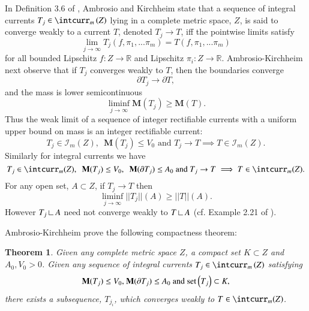 \documentclass[12pt]{amsart}
\newtheorem{thm}{Theorem}[section]
\begin{document}
In Definition 3.6 of \cite{AK}, Ambrosio and Kirchheim state that a
sequence of integral currents $T_j \in \intcurr_m\left(Z\right)$ 
lying in a complete metric space, $Z$,
is said to converge weakly to a current $T$, denoted $T_j {\to} T$,
 iff the pointwise limits satisfy
\begin{equation}
\lim_{j\to \infty}  T_j\left(f, \pi_1,...\pi_m\right) = T\left(f, \pi_1,...\pi_m\right) 
\end{equation}
for all bounded Lipschitz $f: Z \to {\mathbb{R}}$ and Lipschitz $\pi_i: Z \to {\mathbb{R}}$.
Ambrosio-Kirchheim next observe that if $T_j$ converges weakly to $T$, then 
the boundaries converge
\begin{equation}\label{bndry-conv}
\partial T_j {\to} \partial T,   
\end{equation}
and the mass is lower semicontinuous
\begin{equation}\label{semicont}
\liminf_{j\to\infty} {{\mathbf M}}(T_j) \ge {{\mathbf M}}(T).
\end{equation}
Thus the weak limit of a sequence of integer rectifiable
currents with a uniform upper bound on mass is an
integer rectifiable current:
\begin{equation}
T_j \in {{\mathcal I}}_m(Z), \,\,\,{{\mathbf M}}(T_j) \le V_0
\textrm{ and }
T_j \to T \implies T \in {{\mathcal I}}_m(Z).
\end{equation}
Similarly for integral currents we have
\begin{equation}
T_j \in \intcurr_m(Z), \,\,\,{{\mathbf M}}(T_j) \le V_0,\,\,\,{{\mathbf M}}(\partial T_j) \le A_0
\textrm{ and }
T_j \to T \implies T \in \intcurr_m(Z).
\end{equation}
For any open set, $A\subset Z$, if $T_j \to T$ then
\begin{equation}
\liminf_{j\to\infty} ||T_j||(A) \ge ||T||(A).  
\end{equation}
However $T_j {\:\mbox{\rule{0.1ex}{1.2ex}\rule{1.1ex}{0.1ex}}\:} A$ need not converge weakly to $T {\:\mbox{\rule{0.1ex}{1.2ex}\rule{1.1ex}{0.1ex}}\:} A$
(cf. Example 2.21 of \cite{Sormani-AA}).

Ambrosio-Kirchheim prove the following compactness theorem:

\begin{thm}\label{AK-compact}\cite{AK}
Given any complete metric space 
$Z$, a compact set $K \subset Z$ and $A_0, V_0>0$.
Given
any sequence of integral currents  $T_j \in \intcurr_m \left(Z\right)$ satisfying
\begin{equation}\label{AK-compactness}
{{\mathbf M}}(T_j) \le V_0 \textrm{, } {{\mathbf M}}(\partial T_j) \le A_0
\textrm{ and }
{{\rm{set}}}\left(T_j\right) \subset K,
\end{equation} there exists a subsequence, $T_{j_i}$, 
which converges weakly to $T\in \intcurr_m(Z)$.
\end{thm}
\end{document}
